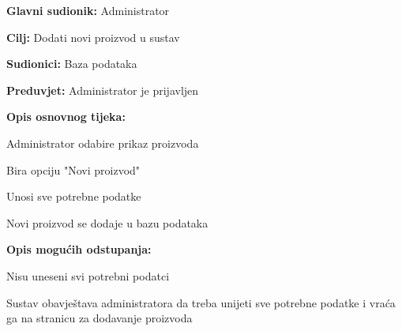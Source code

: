 					\noindent {}
					\begin{packed_item}
						
						\item \textbf{Glavni sudionik:} Administrator
						\item  \textbf{Cilj:} Dodati novi proizvod u sustav
						\item  \textbf{Sudionici:} Baza podataka
						\item  \textbf{Preduvjet:} Administrator je prijavljen
						\item  \textbf{Opis osnovnog tijeka:}
						
						\item[] \begin{packed_enum}
							
							\item Administrator odabire prikaz proizvoda
							\item Bira opciju "Novi proizvod"
							\item Unosi sve potrebne podatke
							\item Novi proizvod se dodaje u bazu podataka
							
						\end{packed_enum}
						
						\item  \textbf{Opis mogućih odstupanja:}
						
						\item[] \begin{packed_item}
							
							\item[3.a] Nisu uneseni svi potrebni podatci
							\item[] \begin{packed_enum}
								
								\item Sustav obavještava administratora da treba unijeti sve potrebne podatke i vraća ga na stranicu za dodavanje proizvoda
							\end{packed_enum}
							
						\end{packed_item}	
							
					\end{packed_item}
				

